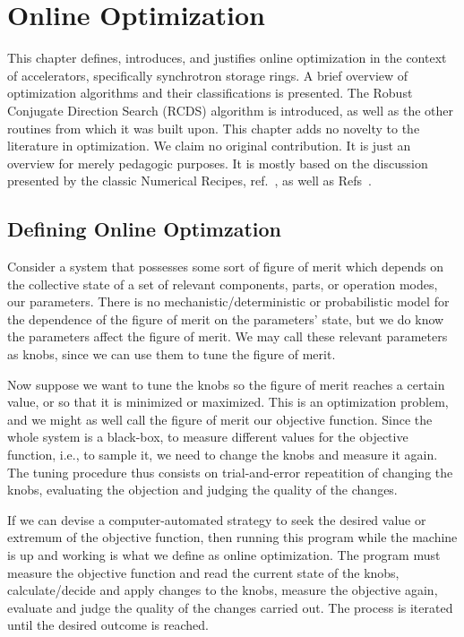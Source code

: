 \chapter{Online Optimization}
This chapter defines, introduces, and justifies online optimization in the context of accelerators, specifically synchrotron storage rings. A brief overview of optimization algorithms and their classifications is presented. The Robust Conjugate Direction Search (RCDS) algorithm is introduced, as well as the other routines from which it was built upon. This chapter adds no novelty to the literature in optimization. We claim no original contribution. It is just an overview for merely pedagogic purposes. It is mostly based on the discussion presented by the classic Numerical Recipes, ref.~\cite{press_numerical_2007}, as well as Refs~\cite{huang_beam-based_2019, huang_algorithm_2013}.
\section{Defining Online Optimzation}
Consider a system that possesses some sort of figure of merit which depends on the collective state of a set of relevant components, parts, or operation modes, our parameters. There is no mechanistic/deterministic or probabilistic model for the dependence of the figure of merit on the parameters' state, but we do know the parameters affect the figure of merit. We may call these relevant parameters as knobs, since we can use them to tune the figure of merit.

Now suppose we want to tune the knobs so the figure of merit reaches a certain value, or so that it is minimized or maximized. This is an optimization problem, and we might as well call the figure of merit our objective function. Since the whole system is a black-box, to measure different values for the objective function, i.e., to sample it, we need to change the knobs and measure it again. The tuning procedure thus consists on trial-and-error repeatition of changing the knobs, evaluating the objection and judging the quality of the changes.

If we can devise a computer-automated strategy to seek the desired value or extremum of the objective function, then running this program while the machine is up and working is what we define as online optimization. The program must measure the objective function and read the current state of the knobs, calculate/decide and apply changes to the knobs, measure the objective again, evaluate and judge the quality of the changes carried out. The process is iterated until the desired outcome is reached.

